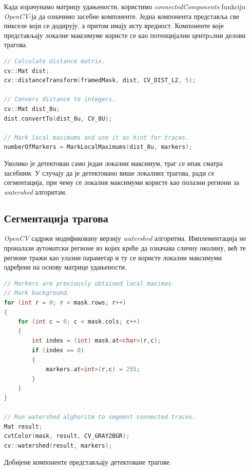 \documentclass[12pt,a4paper,serbian,oneside]{book}
\begin{document}
Када израчунамо матрицу удањености, користимо \textit{connectedComponents} funkciju \textit{OpenCV}-ја да означимо засебне компоненте. Једна компонента представља све пикселе који се додирују, а притом имају исту вредност. Компоненте које представљају локалне максимуме користе се као потенцијални центрaлни делови трагова.

 \begin{lstlisting}[language=C++,label=lst:local_maxima,caption=Проналажење централних региона трагова]
// Calculate distance matrix.
cv::Mat dist;
cv::distanceTransform(framedMask, dist, CV_DIST_L2, 5);

// Convers distance to integers.
cv::Mat dist_8u;
dist.convertTo(dist_8u, CV_8U);

// Mark local maximums and use it as hint for traces.
numberOfMarkers = MarkLocalMaximums(dist_8u, markers);
\end{lstlisting}

Уколико је детектован само један локални максимум, траг се ипак сматра засебним. У случају да је детектовано више локалних трагова, ради се сегментација, при чему се  локални максимуми користе као полазни региони за \textit{watershed} алгоритам.

\subsection{Сегментација трагова}

\textit{OpenCV} садржи модификовану верзију \textit{watershed} алгоритма. Имплементација не проналази аутоматски регионе из којих креће да означава сличну околину, већ те регионе тражи као улазни параметар и ту се користе локални максимуми одређени на основу матрице удањености.

 \begin{lstlisting}[language=C++,label=lst:grayscaleOtsu,caption=Сегментација трагова]
// Markers are previously obtained local maximas.
// Mark background.
for (int r = 0; r < mask.rows; r++)
{
    for (int c = 0; c < mask.cols; c++)
    {
        int index = (int) mask.at<char>(r,c);
        if (index == 0)
        {
            markers.at<int>(r,c) = 255;
        }
    }
}

// Run watershed alghoritm to segment connected traces.
Mat result;
cvtColor(mask, result, CV_GRAY2BGR);
cv::watershed(result, markers);
\end{lstlisting}

Добијене компоненте представљају детектоване трагове.
\end{document}
